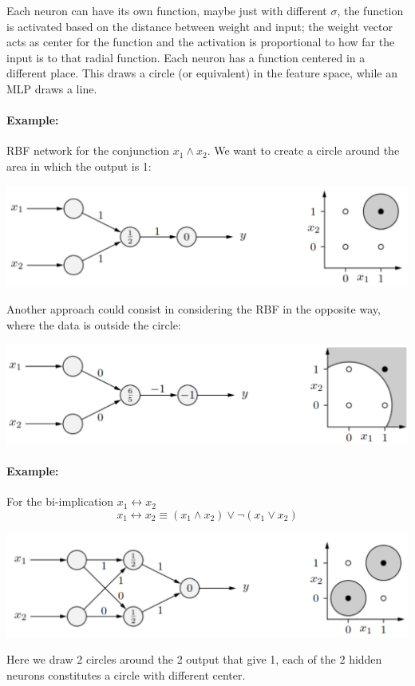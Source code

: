 Each neuron can have its own function, maybe just with different $\sigma$, the function is activated based on the distance between weight and input; the weight vector acts as center for the function and the activation is proportional to how far the input is to that radial function. Each neuron has a function centered in a different place. This draws a circle (or equivalent) in the feature space, while an MLP draws a line.\\

\paragraph{Example:} RBF network for the conjunction $x_1 \wedge x_2$. We want to create a circle around the area in which the output is 1:
\begin{center}
	\includegraphics[width=0.8\columnwidth]{img/NN/RBF1}
\end{center}
Another approach could consist in considering the RBF in the opposite way, where the data is outside the circle:
\begin{center}
	\includegraphics[width=0.8\columnwidth]{img/NN/RBF2}
\end{center}

\newpage

\paragraph{Example:} For the bi-implication $x_1 \leftrightarrow x_2$
$$ x_1 \leftrightarrow x_2 \equiv (x_1 \wedge x_2) \vee \neg (x_1 \vee x_2) $$
\begin{center}
	\includegraphics[width=0.75\columnwidth]{img/NN/RBF3}
\end{center}
Here we draw 2 circles around the 2 output that give 1, each of the 2 hidden neurons constitutes a circle with different center.\\

